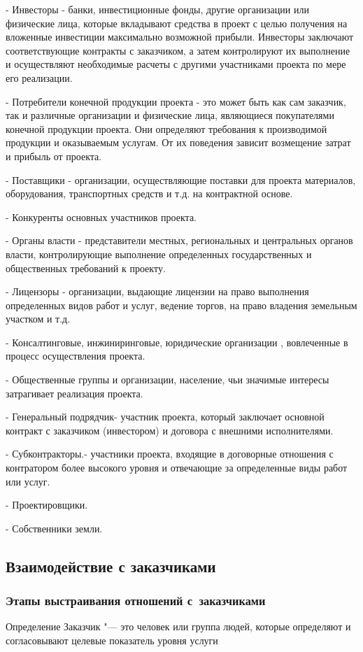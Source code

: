 \documentclass{../industrial-development}
\begin{document}
- Инвесторы - банки, инвестиционные фонды, другие организации или физические лица, которые вкладывают средства в проект с целью получения на вложенные инвестиции максимально возможной прибыли. Инвесторы заключают соответствующие контракты с заказчиком, а затем контролируют их выполнение и осуществляют необходимые расчеты с другими участниками проекта по мере его реализации.

- Потребители конечной продукции проекта - это может быть как сам заказчик, так и различные организации и физические лица, являющиеся покупателями конечной продукции проекта. Они определяют требования к производимой продукции и оказываемым услугам. От их поведения зависит возмещение затрат и прибыль от проекта.

- Поставщики - организации, осуществляющие поставки для проекта материалов, оборудования, транспортных средств и т.д. на контрактной основе.

- Конкуренты основных участников проекта.

- Органы власти - представители местных, региональных и центральных органов власти, контролирующие выполнение определенных государственных и общественных требований к проекту.

- Лицензоры - организации, выдающие лицензии на право выполнения определенных видов работ и услуг, ведение торгов, на право владения земельным участком и т.д.

- Консалтинговые, инжиниринговые, юридические организации , вовлеченные в процесс осуществления проекта.

- Общественные группы и организации, население, чьи значимые интересы затрагивает реализация проекта.

- Генеральный подрядчик- участник проекта, который заключает основной контракт с заказчиком (инвестором) и договора с внешними исполнителями.

- Субконтракторы.- участники проекта, входящие в договорные отношения с контратором более высокого уровня и отвечающие за определенные виды работ или услуг.

- Проектировщики.

- Собственники земли.

\subsection{Взаимодействие с заказчиками}
\begin{frame} \frametitle{Этапы выстраивания отношений с~заказчиками}
	\begin{block}{Определение}
		\alert{Заказчик} "--- это человек или группа людей, которые определяют и согласовывают целевые показатель уровня услуги
	\end{block}
\end{frame}
	
\end{document}
